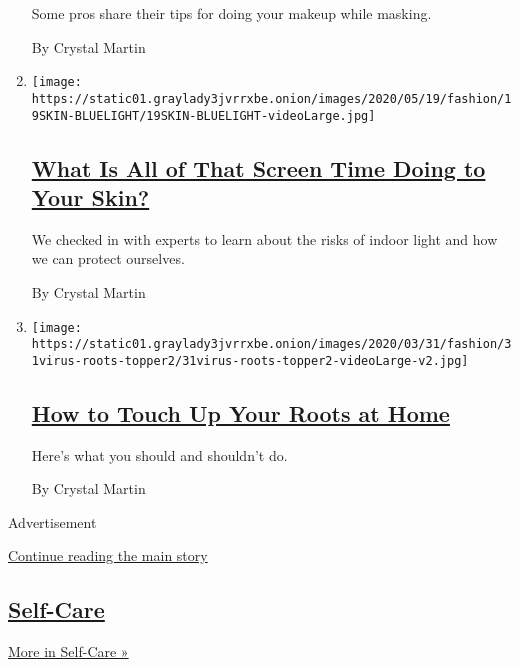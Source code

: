 \begin{enumerate}
  Some pros share their tips for doing your makeup while masking.

  By Crystal Martin
\item
  \texttt{[image: https://static01.graylady3jvrrxbe.onion/images/2020/05/19/fashion/19SKIN-BLUELIGHT/19SKIN-BLUELIGHT-videoLarge.jpg]}

  \hypertarget{what-is-all-of-that-screen-time-doing-to-your-skin}{%
  \subsection{\texorpdfstring{\href{/2020/05/20/style/skin-damage-blue-light-what-is-all-of-that-screen-time-doing-to-your-skin.html}{What
  Is All of That Screen Time Doing to Your
  Skin?}}{What Is All of That Screen Time Doing to Your Skin?}}\label{what-is-all-of-that-screen-time-doing-to-your-skin}}

  We checked in with experts to learn about the risks of indoor light
  and how we can protect ourselves.

  By Crystal Martin
\item
  \texttt{[image: https://static01.graylady3jvrrxbe.onion/images/2020/03/31/fashion/31virus-roots-topper2/31virus-roots-topper2-videoLarge-v2.jpg]}

  \hypertarget{how-to-touch-up-your-roots-at-home}{%
  \subsection{\texorpdfstring{\href{/2020/03/31/style/how-to-touch-up-your-roots-at-home.html}{How
  to Touch Up Your Roots at
  Home}}{How to Touch Up Your Roots at Home}}\label{how-to-touch-up-your-roots-at-home}}

  Here's what you should and shouldn't do.

  By Crystal Martin
\end{enumerate}

Advertisement

\protect\hyperlink{after-mid3}{Continue reading the main story}

\hypertarget{self-care}{%
\subsection{\texorpdfstring{\href{/section/style/self-care}{Self-Care}}{Self-Care}}\label{self-care}}

\href{/section/style/self-care}{More in Self-Care »}

